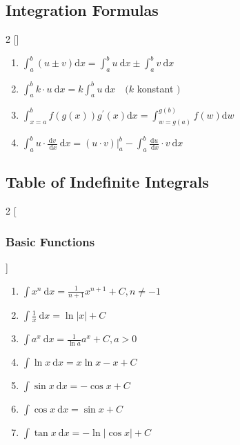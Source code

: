 \subsection{Integration Formulas}
\begin{multicols}{2}
[]
 \begin{enumerate}
    \item $\int_{a}^{b}(u \pm v) \mathrm{d} x=\int_{a}^{b} u \mathrm{~d} x \pm \int_{a}^{b} v \mathrm{~d} x$
    \item $\int_{a}^{b} k \cdot u \mathrm{~d} x=k \int_{a}^{b} u \mathrm{~d} x \quad(k$ konstant $)$
    \item $\int_{x=a}^{b} f(g(x)) g^{\prime}(x) \mathrm{d} x=\int_{w=g(a)}^{g(b)} f(w) \mathrm{d} w$
    \item $\int_{a}^{b} u \cdot \frac{\mathrm{d} v}{\mathrm{~d} x} \mathrm{~d} x=\left.(u \cdot v)\right|_{a} ^{b}-\int_{a}^{b} \frac{\mathrm{d} u}{\mathrm{~d} x} \cdot v \mathrm{~d} x$
 \end{enumerate}
\end{multicols}

\subsection{Table of Indefinite Integrals}
\begin{multicols}{2}
[\subsubsection{Basic Functions}]
 \begin{enumerate}
\item $\int x^{n} \mathrm{~d} x=\frac{1}{n+1} x^{n+1}+C, n \neq-1$
\item $\int \frac{1}{x} \mathrm{~d} x=\ln |x|+C$
\item $\int a^{x} \mathrm{~d} x=\frac{1}{\ln a} a^{x}+C, a>0$
\item $\int \ln x \mathrm{~d} x=x \ln x-x+C$
\item $\int \sin x \mathrm{~d} x=-\cos x+C$
\item $\int \cos x \mathrm{~d} x=\sin x+C$
\item $\int \tan x \mathrm{~d} x=-\ln |\cos x|+C$
 \end{enumerate}
\end{multicols}


